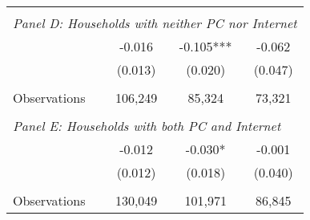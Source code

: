 {\begin{tabular}{lccc}
&  &  &   \\
\multicolumn{4}{l}{\textit{Panel D: Households with neither PC nor Internet}} \\
\hspace{3mm}        &      -0.016   &      -0.105***&      -0.062   \\
                    &     (0.013)   &     (0.020)   &     (0.047)   \\
                    &               &               &               \\
\hspace{3mm}Observations&     106,249   &      85,324   &      73,321   \\
 
&  &  &   \\
\multicolumn{4}{l}{\textit{Panel E: Households with both PC and Internet}} \\
\hspace{3mm}        &      -0.012   &      -0.030*  &      -0.001   \\
                    &     (0.012)   &     (0.018)   &     (0.040)   \\
                    &               &               &               \\
\hspace{3mm}Observations&     130,049   &     101,971   &      86,845   \\
 

\bottomrule
\end{tabular}
}
